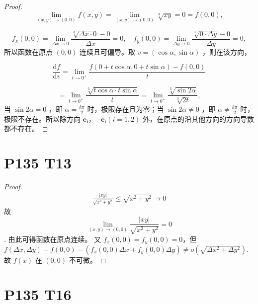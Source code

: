 \documentclass{article}
\newcommand{\dd}{\mathrm{d}}
\begin{document}
\begin{proof}
    
$$
\lim_{(x,y) \to (0,0)} f(x,y) = \lim_{(x,y) \to (0,0)} \sqrt[3]{xy} = 0 = f(0,0),
$$ 

 $$
f_x(0,0) = \lim_{\Delta x \to 0} \frac{\sqrt[3]{\Delta x \cdot 0} - 0}{\Delta x} = 0, \quad f_y(0,0) = \lim_{\Delta y \to 0} \frac{\sqrt[3]{0 \cdot \Delta y} - 0}{\Delta y} = 0,
$$ 
所以函数在原点  $(0,0)$  连续且可偏导。取  $v = (\cos \alpha, \sin \alpha)$ ，则在该方向，

$$
\frac{\dd f}{\dd v} = \lim_{t \to 0^+} \frac{f(0 + t \cos \alpha, 0 + t \sin \alpha) - f(0,0)}{t}
$$ 

 $$
= \lim_{t \to 0^+} \frac{\sqrt[3]{t \cos \alpha \cdot t \sin \alpha}}{t} = \lim_{t \to 0^+} \frac{\sqrt[3]{\sin 2\alpha}}{\sqrt[3]{2t}},
$$ 
当  $\sin 2\alpha = 0$ ，即  $\alpha = \frac{k\pi}{2}$  时，极限存在且为零；当  $\sin 2\alpha \neq 0$ ，即  $\alpha \neq \frac{k\pi}{2}$  时，极限不存在。所以除方向  $\boldsymbol{e_i}$，$\boldsymbol{-e_i} (i = 1,2)$  外，在原点的沿其他方向的方向导数都不存在。

\end{proof}

\section*{P135 T13}

\begin{proof}
    \begin{align*}
        \frac{\left\lvert xy\right\rvert}{\sqrt{x^2 + y^2}} \leq \sqrt{x^2 + y^2} \to 0
    \end{align*} 故 $$\lim_{(x,y) \to (0,0)} \frac{\left\lvert xy\right\rvert}{\sqrt{x^2 + y^2}} = 0$$. 由此可得函数在原点连续。
    又 $f_x(0, 0) = f_y(0, 0) = 0$，但 $f(\Delta x, \Delta y) - f(0, 0) - (f_x(0, 0)\Delta x + f_y(0, 0)\Delta y) \neq o(\sqrt{\Delta x^2 + \Delta y^2})$. 故 $f(x)$ 在 $(0, 0)$ 不可微。
\end{proof}

\section*{P135 T16}
\end{document}
